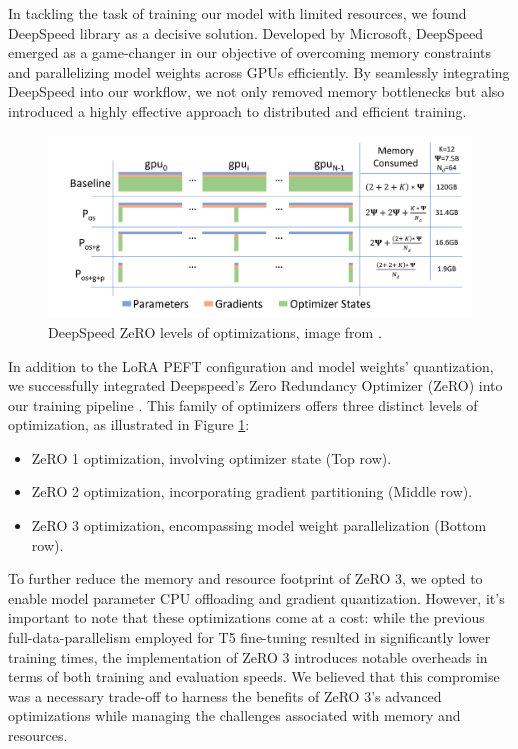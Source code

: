 \documentclass{article}
\begin{document}
In tackling the task of training our model with limited resources, we found DeepSpeed library as a decisive solution. Developed by Microsoft, DeepSpeed emerged as a game-changer in our objective of overcoming memory constraints and parallelizing model weights across GPUs efficiently. By seamlessly integrating DeepSpeed into our workflow, we not only removed memory bottlenecks but also introduced a highly effective approach to distributed and efficient training. 
\begin{figure}[ht]
    \centering
    \includegraphics[width=\linewidth]{assets/zero-opt.png}
    \caption{DeepSpeed ZeRO levels of optimizations, image from \cite{rajbhandari2020zero}.}
    \label{fig:zero}
\end{figure}

In addition to the LoRA PEFT configuration and model weights' quantization, we successfully integrated Deepspeed's Zero Redundancy Optimizer (ZeRO) into our training pipeline \cite{rajbhandari2020zero}. This family of optimizers offers three distinct levels of optimization, as illustrated in Figure \ref{fig:zero}:

\begin{itemize}
    \item ZeRO 1 optimization, involving optimizer state (Top row).
    \item ZeRO 2 optimization, incorporating gradient partitioning (Middle row).
    \item ZeRO 3 optimization, encompassing model weight parallelization (Bottom row).
\end{itemize}

To further reduce the memory and resource footprint of ZeRO 3, we opted to enable model parameter CPU offloading and gradient quantization. However, it's important to note that these optimizations come at a cost: while the previous full-data-parallelism employed for T5 fine-tuning resulted in significantly lower training times, the implementation of ZeRO 3 introduces notable overheads in terms of both training and evaluation speeds. We believed that this compromise was a necessary trade-off to harness the benefits of ZeRO 3's advanced optimizations while managing the challenges associated with memory and resources. 
\end{document}
